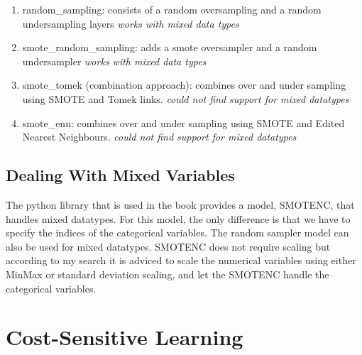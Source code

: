 \documentclass{article}
\begin{document}
\begin{enumerate}
    \item random\_sampling: consists of a random oversampling and a random undersampling layers \textit{works with mixed data types}
    \item smote\_random\_sampling: adds a smote oversampler and a random undersampler \textit{works with mixed data types}
    \item smote\_tomek (combination approach): combines over and under sampling using SMOTE and Tomek links. \textit{could not find support for mixed datatypes}
    \item smote\_enn: combines over and under sampling using SMOTE and Edited Nearest Neighbours. \textit{could not find support for mixed datatypes}
\end{enumerate}

\subsection{Dealing With Mixed Variables}
The python library that is used in the book provides a model, SMOTENC, that handles mixed datatypes. For this model, the only difference is that we have to specify the indices of the categorical variables. The random sampler model can also be used for mixed datatypes. SMOTENC does not require scaling but according to my search it is adviced to scale the numerical variables using either MinMax or standard deviation scaling, and let the SMOTENC handle the categorical variables.

\section{Cost-Sensitive Learning}
\end{document}

